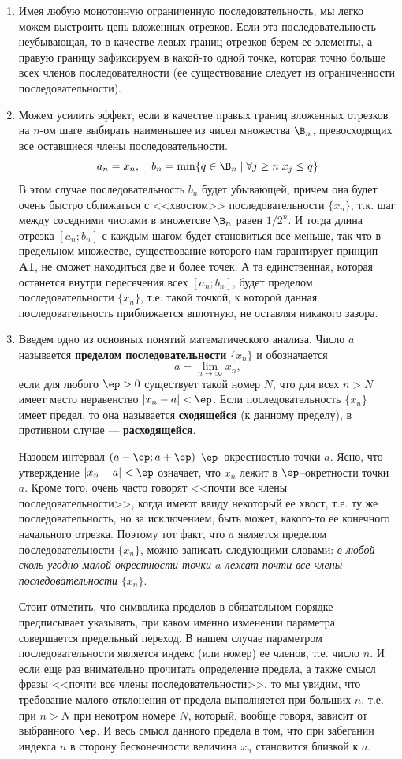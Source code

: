 \begin{enumerate}
\item Имея любую монотонную ограниченную последовательность, мы легко можем выстроить цепь вложенных отрезков. Если эта последовательность неубывающая, то в качестве левых границ отрезков берем ее элементы, а правую границу зафиксируем в какой-то одной точке, которая точно больше всех членов последователности (ее существование следует из ограниченности последовательности).
\item Можем усилить эффект, если в качестве правых границ вложенных отрезков на $n$-ом шаге выбирать наименьшее из чисел множества $\B_n$, превосходящих все оставшиеся члены последовательности.
$$
a_n=x_n,\quad b_n=\min\{q\in\B_n\mid \forall j\ge n\;x_j\le q\}
$$
В этом случае последовательность $b_n$ будет убывающей, причем она будет очень быстро сближаться с <<хвостом>> последовательности $\{x_n\}$, т.к. шаг между соседними числами в множетсве $\B_n$ равен $1/2^n$. И тогда длина отрезка $[a_n;b_n]$ с каждым шагом будет становиться все меньше, так что в предельном множестве, существование которого нам гарантирует принцип \textbf{A1}, не сможет находиться две и более точек. А та единственная, которая останется внутри пересечения всех $[a_n;b_n]$, будет пределом последовательности $\{x_n\}$, т.е. такой точкой, к которой данная последовательность приближается вплотную, не оставляя никакого зазора.
\item Введем одно из основных понятий математического анализа. Число $a$ называется \textbf{пределом последовательности} $\{x_n\}$ и обозначается
$$
a = \lim_{n\to\infty}x_n,
$$
если для любого $\ep>0$ существует такой номер $N$, что для всех $n>N$ имеет место неравенство $|x_n-a|<\ep$. Если последовательность $\{x_n\}$ имеет предел, то она называется \textbf{сходящейся} (к данному пределу), в противном случае --- \textbf{расходящейся}.

Назовем интервал $(a-\ep;a+\ep)$ $\ep$--окрестностью точки $a$. Ясно, что утверждение $|x_n-a|<\ep$ означает, что $x_n$ лежит в $\ep$--окретности точки $a$. Кроме того, очень часто говорят <<почти все члены последовательности>>, когда имеют ввиду некоторый ее хвост, т.е. ту же последовательность, но за исключением, быть может, какого-то ее конечного начального отрезка. Поэтому тот факт, что $a$ является пределом последовательности $\{x_n\}$, можно записать следующими словами: \textit{в любой сколь угодно малой окрестности точки $a$ лежат почти все члены последовательности} $\{x_n\}$.

Стоит отметить, что символика пределов в обязательном порядке предписывает указывать, при каком именно изменении параметра совершается предельный переход. В нашем случае параметром последовательности является индекс (или номер) ее членов, т.е. число $n$. И если еще раз внимательно прочитать определение предела, а также смысл фразы <<почти все члены последовательности>>, то мы увидим, что требование малого отклонения от предела выполняется при больших $n$, т.е. при $n>N$ при некотром номере $N$, который, вообще говоря, зависит от выбранного $\ep$. И весь смысл данного предела в том, что при забегании индекса $n$ в сторону бесконечности величина $x_n$ становится близкой к $a$.


\end{enumerate}
